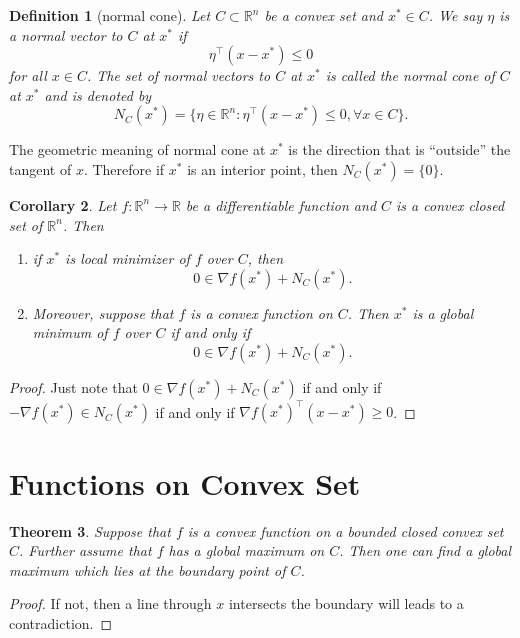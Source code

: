 \documentclass[12pt,a4paper]{report}
\numberwithin{equation}{section}
\theoremstyle{mystyle}
\newtheorem{definition}{Definition}[section]
\newtheorem{theorem}[definition]{Theorem}
\newtheorem{corollary}[definition]{Corollary}
\newcommand{\R}{\mathbb{R}}
\newcommand{\grad}{\nabla}
\newcommand{\T}{\top}
\begin{document}
	\begin{definition}[normal cone]
		Let $C\subset \R^n$ be a convex set and $x^*\in C$. We say $\eta$ is a \emph{normal vector} to $C$ at $x^*$ if 
		$$
		\eta^\T (x-x^*)\leq 0
		$$
		for all $x\in C$. The set of normal vectors to $C$ at $x^*$ is called the \emph{normal cone} of $C$ at $x^*$ and is denoted by
		$$
		N_C(x^*)=\{\eta\in \R^n:\eta^\T (x-x^*)\leq 0,\forall x\in C \}.
		$$
	\end{definition}
	The geometric meaning of normal cone at $x^*$ is the direction that is ``outside'' the tangent of $x$. Therefore if $x^*$ is an interior point, then $N_C(x^*)=\{0\}$.
	\begin{corollary}
		Let $f:\R^n \to \R$ be a differentiable function and $C$ is a convex closed set of $\R^n$. Then
		\begin{enumerate}
			\item if $x^*$ is local minimizer of $f$ over $C$, then
			$$
			0\in \grad f(x^*)+N_C(x^*).
			$$
			\item Moreover, suppose that $f$ is a convex function on $C$. Then $x^*$ is a global minimum of $f$ over $C$ if and only if
			$$
			0\in \grad f(x^*)+N_C(x^*).
			$$
		\end{enumerate}
	\end{corollary}
	\begin{proof}
		Just note that $0\in \grad f(x^*)+N_C(x^*)$ if and only if $-\grad f(x^*)\in N_C(x^*)$ if and only if $\grad f(x^*)^\T (x-x^*)\geq 0$.
	\end{proof}
	
	
	
	\section{Functions on Convex Set}
	\begin{theorem}
		Suppose that $f$ is a convex function on a bounded closed convex set $C$. Further assume that $f$ has a global maximum on $C$. Then one can find a global maximum which lies at the boundary point of $C$.
	\end{theorem}
	\begin{proof}
		If not, then a line through $x$ intersects the boundary will leads to a contradiction.
	\end{proof}
	
\end{document}
